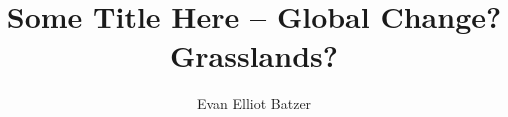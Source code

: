 \documentclass[twoside,12pt,final]{ucthesis-CA2012}
\begin{document}
\begin{ucfrontmatter}


  \title{Some Title Here -- Global Change? Grasslands?}
  \author{Evan Elliot Batzer}

   
  \othermemberC{} %
  
	\maketitle
	
  

\end{ucfrontmatter}
\end{document}
